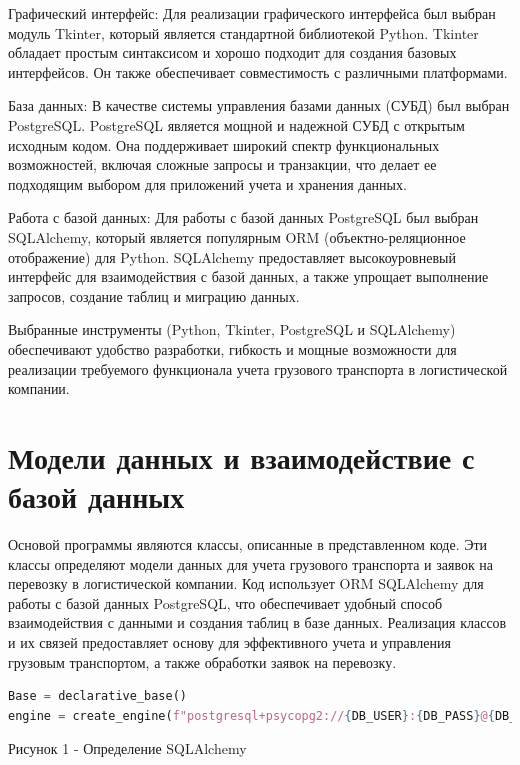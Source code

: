 \documentclass[14pt]{extreport}
\begin{document}
        Графический интерфейс: Для реализации графического интерфейса был выбран модуль Tkinter, который является стандартной библиотекой Python. Tkinter обладает простым синтаксисом и хорошо подходит для создания базовых интерфейсов. Он также обеспечивает совместимость с различными платформами.

        База данных: В качестве системы управления базами данных (СУБД) был выбран PostgreSQL. PostgreSQL является мощной и надежной СУБД с открытым исходным кодом. Она поддерживает широкий спектр функциональных возможностей, включая сложные запросы и транзакции, что делает ее подходящим выбором для приложений учета и хранения данных.

        Работа с базой данных: Для работы с базой данных PostgreSQL был выбран SQLAlchemy, который является популярным ORM (объектно-реляционное отображение) для Python. SQLAlchemy предоставляет высокоуровневый интерфейс для взаимодействия с базой данных, а также упрощает выполнение запросов, создание таблиц и миграцию данных.

        Выбранные инструменты (Python, Tkinter, PostgreSQL и SQLAlchemy) обеспечивают удобство разработки, гибкость и мощные возможности для реализации требуемого функционала учета грузового транспорта в логистической компании.

    \section{Модели данных и взаимодействие с базой данных}
        Основой программы являются классы, описанные в представленном коде. Эти классы определяют модели данных для учета грузового транспорта и заявок на перевозку в логистической компании. Код использует ORM SQLAlchemy для работы с базой данных PostgreSQL, что обеспечивает удобный способ взаимодействия с данными и создания таблиц в базе данных. Реализация классов и их связей предоставляет основу для эффективного учета и управления грузовым транспортом, а также обработки заявок на перевозку.

        \begin{lstlisting}[language=Python]
Base = declarative_base()
engine = create_engine(f"postgresql+psycopg2://{DB_USER}:{DB_PASS}@{DB_HOST}:{DB_PORT}/{DB_NAME}")
        \end{lstlisting}
        \begin{center}
            Рисунок 1 - Определение SQLAlchemy
        \end{center}
\end{document}
